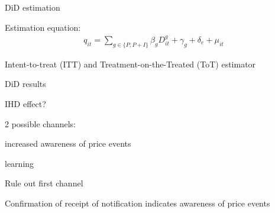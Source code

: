 \documentclass[aspectratio=169]{beamer}
\newenvironment{wideitemize}{\itemize\addtolength{\itemsep}{10pt}}{\enditemize}
\begin{document}
\begin{frame}{DiD estimation}
    \begin{wideitemize}
        \item Estimation equation:
            \begin{align*}
                q _ { i t } = \sum _ { g \in \{ P , P + I \} } \beta _ { g } D _ { i t } ^ { g } + \gamma _ { g } + \delta _ { e } + \mu _ { i t }
            \end{align*}
        \item Intent-to-treat (ITT) and Treatment-on-the-Treated (ToT) estimator
\end{wideitemize}
\end{frame}

\begin{frame}{DiD results}
    \center
\end{frame}

\begin{frame}{IHD effect?}
    \begin{wideitemize}
        \item 2 possible channels:
        \begin{wideitemize}
            \item increased awareness of price events
            \item learning
        \end{wideitemize}
        \item Rule out first channel
        \item Confirmation of receipt of notification indicates awareness of price events
    \end{wideitemize}
\end{frame}
\end{document}
